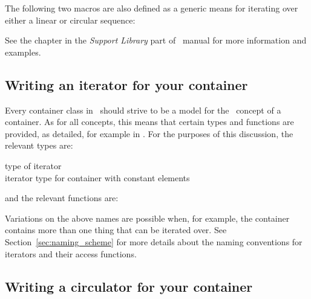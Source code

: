 The following two macros are also defined as a generic means for iterating
over either a linear or circular sequence:



See the chapter  
 in the {\em Support Library} part of \cgal\ manual 
for more information and examples.

\subsection{Writing an iterator for your container\label{sec:class_iterator}}

Every container class in \cgal\ should strive to be a model for the
\stl\ concept of a container.  As for all concepts, this means that 
certain types and functions are provided, as detailed, for example 
in \cite{cgal:a-gps-98}.  For the purposes of this discussion, the relevant
types are:
\begin{tabbing}
 \> type of iterator \\
 \> iterator type for container with constant elements
\end{tabbing}

and the relevant functions are:

Variations on the above names are possible when, for example, the container
contains more than one thing that can be iterated over.  See 
Section~\ref{sec:naming_scheme} for more details about the naming conventions
for iterators and their access functions.

\subsection{Writing a circulator for your container\label{sec:class_circulator}}

